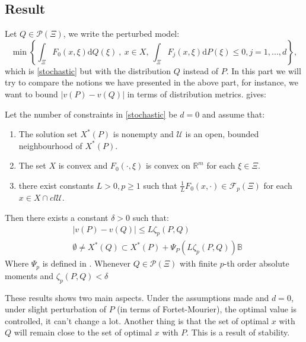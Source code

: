 \documentclass{amsart}
\newcommand{\RR}{\mathbb{R}}
\begin{document}
\subsection{Result}
Let $Q\in\mathcal{P}\left(\Xi\right)$, we write the perturbed model:
\begin{equation*}
    \min\left\{\int_\Xi F_0\left(x,\xi\right)\text{d}Q\left(\xi\right)\:,\: x\in X, \: \int_\Xi F_j\left(x,\xi\right)\text{d}P\left(\xi\right)\leq0, j=1,...,d\right\},
\end{equation*}
which is \eqref{stochastic} but with the distribution $Q$ instead of $P$. In this part we will try to compare the notions we have presented in the above part, for instance, we want to bound $\lvert v\left(P\right)-v\left(Q\right)\rvert$ in terms of distribution metrics. \cite[Corollary 14]{romisch_stability_2003} gives:
\begin{theorem}\label{stability}
    Let the number of constraints in \eqref{stochastic} be $d=0$ and assume that:
    \begin{enumerate}
        \item The  solution set $X^*\left(P\right)$ is nonempty and $\mathcal{U}$ is an open, bounded neighbourhood of $X^*\left(P\right)$.
        \item The set $X$ is convex and $F_0\left(\cdot,\xi\right)$ is convex on $\RR^m$ for each $\xi\in\Xi$.
        \item there exist constants $L>0, p\geq1$ such that $\frac{1}{L}F_0\left(x,\cdot \right)\in\mathcal{F}_p\left(\Xi\right)$ for each $x\in X\cap cl\mathcal{U}$. 
    \end{enumerate}
    Then there exists a constant $\delta>0$ such that:
    \begin{align*}
        &\lvert v\left(P\right)-v\left(Q\right)\rvert \leq L\zeta_p\left(P,Q\right) \\
        & \emptyset \ne X^*\left(Q\right)\subset X^*\left(P\right)+\Psi_P\left(L\zeta_p\left(P,Q\right)\right)\mathbb{B}
    \end{align*}
    Where $\Psi_p$ is defined in \cite[2.22-2.23]{romisch_stability_2003}. Whenever $Q\in\mathcal{P}\left(\Xi\right)$ with finite $p$-th order absolute moments and $\zeta_p\left(P,Q\right)<\delta$
\end{theorem}
These results shows two main aspects. Under the assumptions made and $d=0$, under slight perturbation of $P$ (in terms of Fortet-Mourier), the optimal value is controlled, it can't change a lot. Another thing is that the set of optimal $x$ with $Q$ will remain close to the set of optimal $x$ with $P$. This is a result of stability. 
\end{document}
